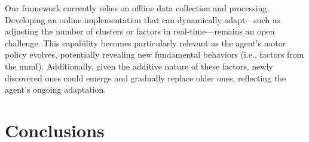 Our framework currently relies on offline data collection and processing. Developing an online implementation that can dynamically adapt—such as adjusting the number of clusters or factors in real-time—remains an open challenge. This capability becomes particularly relevant as the agent's motor policy evolves, potentially revealing new fundamental behaviors (i.e., factors from the \ac{nnmf}). Additionally, given the additive nature of these factors, newly discovered ones could emerge and gradually replace older ones, reflecting the agent's ongoing adaptation.

\section{Conclusions}\label{sec:conclusion}

